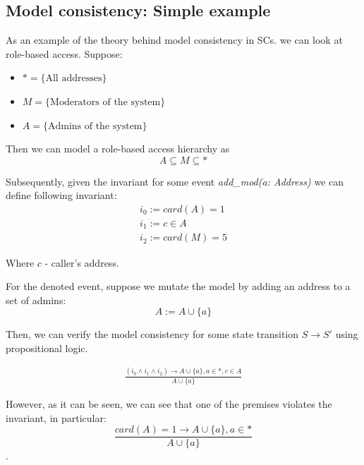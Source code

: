 \documentclass[oneside]{ecsproject}     %
\begin{document}
\newpage
\subsection{Model consistency: Simple example}

As an example of the theory behind model consistency in SCs. we can look at role-based access. Suppose:
\begin{itemize}
  \item $* = \{ \text{All addresses} \}$
  \item $M = \{ \text{Moderators of the system} \}$
  \item $A = \{ \text{Admins of the system} \}$
\end{itemize}

Then we can model a role-based access hierarchy as 
\[ A \subseteq M \subseteq * \]

Subsequently, given the invariant for some event \textit{add\_mod(a: Address)} we can define following invariant:
\begin{equation*}
    \begin{gathered}
      i_0 := card(A) = 1 \\
      i_1 := c \in A \\
      i_2 := card(M) = 5
    \end{gathered}
  \end{equation*}

Where $c$ - caller's address.

For the denoted event, suppose we mutate the model by adding an address to a set of admins:
\begin{equation*}
  A := A \cup \{a\}
\end{equation*}

Then, we can verify the model consistency for some state transition $S \to S'$ using propositional logic.

\begin{equation*}
  \begin{gathered} 
   \frac{(i_0 \wedge i_1 \wedge i_2 ) \rightarrow A \cup \{a\}, a \in *, c \in A}{A \cup \{a\}}
  \end{gathered}
\end{equation*}

However, as it can be seen, we can see that one of the premises violates the invariant, in particular:
\begin{equation*}
  \frac{card(A) = 1 \rightarrow A \cup \{a\}, a \in *}{A \cup \{a\}}
\end{equation*}.
\end{document}
